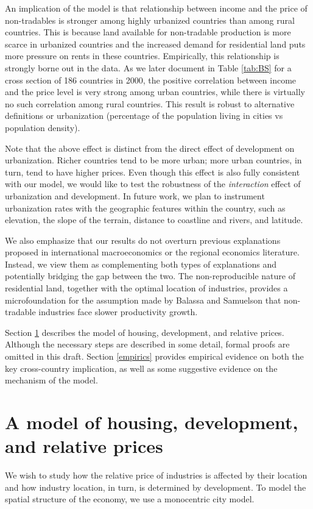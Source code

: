 \documentclass[12pt]{article}
\begin{document}
An implication of the model is that relationship between income and the price of non-tradables is stronger among highly urbanized countries than among rural countries. This is because land available for non-tradable production is more scarce in urbanized countries and the increased demand for residential land puts more pressure on rents in these countries. Empirically, this relationship is strongly borne out in the data. As we later document in Table \ref{tab:BS} for a cross section of 186 countries in 2000, the positive correlation between income and the price level is very strong among urban countries, while there is virtually no such correlation among rural countries. This result is robust to alternative definitions or urbanization (percentage of the population living in cities vs population density).

Note  that the above effect is distinct from the direct effect of development on urbanization. Richer countries tend to be more urban; more urban countries, in turn, tend to have higher prices. Even though this effect is also fully consistent with our model, we would like to test the robustness of the \emph{interaction} effect of urbanization and development. In future work, we plan to instrument urbanization rates with the geographic features within the country, such as elevation, the slope of the terrain, distance to coastline and rivers, and latitude.

We also emphasize that our results do not overturn previous explanations proposed in international macroeconomics or the regional economics literature. Instead, we view them as complementing both types of explanations and potentially bridging the gap between the two. The non-reproducible nature of residential land, together with the optimal location of industries, provides a microfoundation for the {assumption} made by Balassa and Samuelson that non-tradable industries face slower productivity growth.

Section \ref{model} describes the model of housing, development, and relative prices. Although the necessary steps are described in some detail, formal proofs are omitted in this draft. Section \ref{empirics} provides empirical evidence on both the key cross-country implication, as well as some suggestive evidence on the mechanism of the model.

\section{A model of housing, development, and relative prices}\label{model}
We wish to study how the relative price of industries is affected by their location and how industry location, in turn, is determined by development. To model the spatial structure of the economy, we use a monocentric city model.
\end{document}
